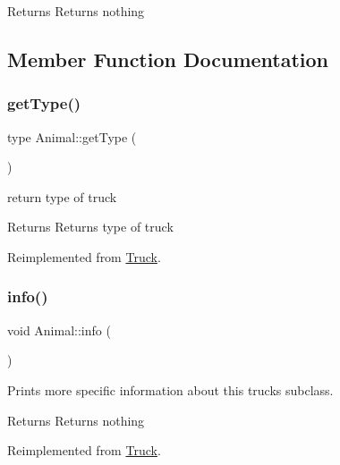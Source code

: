\begin{DoxyReturn}{Returns}
Returns nothing 
\end{DoxyReturn}


\subsection{Member Function Documentation}
\mbox{\label{class_animal_a6e7f8a4a7e8e9571218e3650a0803c03}} 
\subsubsection{\texorpdfstring{get\+Type()}{getType()}}
{\footnotesize\ttfamily type Animal\+::get\+Type (\begin{DoxyParamCaption}{ }\end{DoxyParamCaption})\hspace{0.3cm}{\ttfamily [virtual]}}



return type of truck 

\begin{DoxyReturn}{Returns}
Returns type of truck 
\end{DoxyReturn}


Reimplemented from \hyperlink{class_truck_a24406caf4d09be7f3eff069ce6bc015b}{Truck}.

\mbox{\label{class_animal_a1e99083943239209f4fbe79380ea5991}} 
\subsubsection{\texorpdfstring{info()}{info()}}
{\footnotesize\ttfamily void Animal\+::info (\begin{DoxyParamCaption}{ }\end{DoxyParamCaption})\hspace{0.3cm}{\ttfamily [virtual]}}



Prints more specific information about this truck\textquotesingle{}s subclass. 

\begin{DoxyReturn}{Returns}
Returns nothing 
\end{DoxyReturn}


Reimplemented from \hyperlink{class_truck_a38f09eab2822524e355ecf6d0a13f7de}{Truck}.



